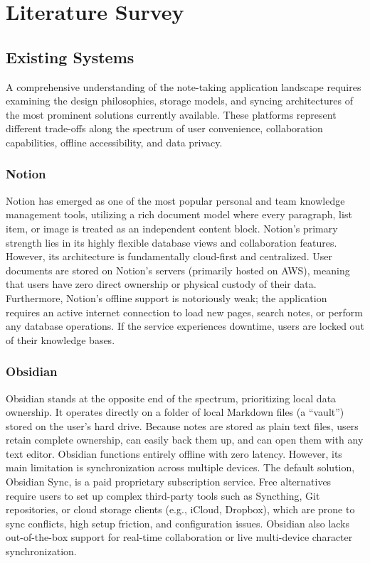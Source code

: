 \documentclass[12pt, a4paper, oneside]{report}
\begin{document}
\chapter{Literature Survey}

\section{Existing Systems}

A comprehensive understanding of the note-taking application landscape requires examining the design philosophies, storage models, and syncing architectures of the most prominent solutions currently available. These platforms represent different trade-offs along the spectrum of user convenience, collaboration capabilities, offline accessibility, and data privacy.

\subsection{Notion}
Notion has emerged as one of the most popular personal and team knowledge management tools, utilizing a rich document model where every paragraph, list item, or image is treated as an independent content block. Notion's primary strength lies in its highly flexible database views and collaboration features. However, its architecture is fundamentally cloud-first and centralized. User documents are stored on Notion's servers (primarily hosted on AWS), meaning that users have zero direct ownership or physical custody of their data. Furthermore, Notion's offline support is notoriously weak; the application requires an active internet connection to load new pages, search notes, or perform any database operations. If the service experiences downtime, users are locked out of their knowledge bases.

\subsection{Obsidian}
Obsidian stands at the opposite end of the spectrum, prioritizing local data ownership. It operates directly on a folder of local Markdown files (a ``vault'') stored on the user's hard drive. Because notes are stored as plain text files, users retain complete ownership, can easily back them up, and can open them with any text editor. Obsidian functions entirely offline with zero latency. However, its main limitation is synchronization across multiple devices. The default solution, Obsidian Sync, is a paid proprietary subscription service. Free alternatives require users to set up complex third-party tools such as Syncthing, Git repositories, or cloud storage clients (e.g., iCloud, Dropbox), which are prone to sync conflicts, high setup friction, and configuration issues. Obsidian also lacks out-of-the-box support for real-time collaboration or live multi-device character synchronization.
\end{document}
